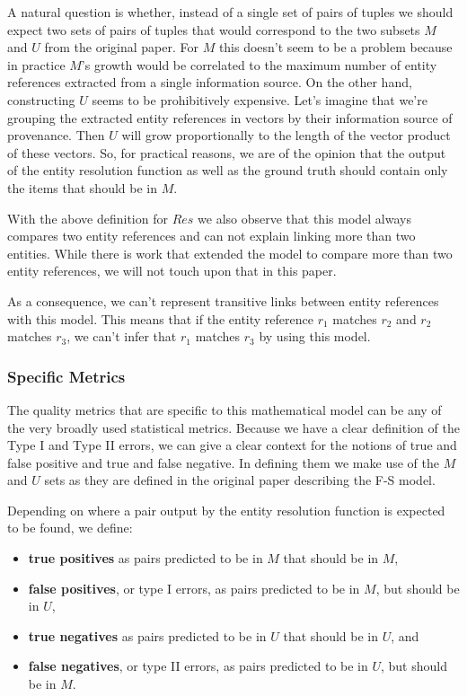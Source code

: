 \documentclass[11pt]{article}
\begin{document}
    A natural question is whether, instead of a single set of pairs of tuples we
    should expect two sets of pairs of tuples that would correspond to the two
    subsets $M$ and $U$ from the original paper.
    For $M$ this doesn't seem to be a problem because in practice $M$'s growth
    would be correlated to the maximum number of entity references extracted
    from a single information source.
    On the other hand, constructing $U$ seems to be prohibitively expensive.
    Let's imagine that we're grouping the extracted entity references in vectors
    by their information source of provenance.
    Then $U$ will grow proportionally to the length of the vector product of
    these vectors.
    So, for practical reasons, we are of the opinion that the output of the
    entity resolution function as well as the ground truth should contain only
    the items that should be in $M$.

    With the above definition for $Res$ we also observe that this model always
    compares two entity references and can not explain linking more than two
    entities\cite{Tal11}.
    While there is work that extended the model to compare more than two 
    entity references\cite{Kon19}, we will not touch upon that in this paper.
    
    As a consequence, we can't represent transitive links between entity
    references with this model.
    This means that if the entity reference $r_1$ matches $r_2$ and
    $r_2$ matches $r_3$, we can't infer that $r_1$ matches $r_3$ by using this
    model\cite{Tal11}.

    \subsubsection[fms-measure]{Specific Metrics}\label{fsm-measure}

    The quality metrics that are specific to this mathematical model can be any
    of the very broadly used statistical metrics.
    Because we have a clear definition of the Type I and Type II errors, we can
    give a clear context for the notions of true and false positive and true and
    false negative.
    In defining them we make use of the $M$ and $U$ sets as they are defined in
    the original paper describing the F-S model.

    Depending on where a pair output by the entity resolution function is
    expected to be found, we define:

    \begin{itemize}
        \item \textbf{true positives} as pairs predicted to be in $M$ that
        should be in $M$,
        \item \textbf{false positives}, or type I errors, as pairs predicted to
        be in $M$, but should be in $U$,
        \item \textbf{true negatives} as pairs predicted to be in $U$ that
        should be in $U$, and
        \item \textbf{false negatives}, or type II errors, as pairs predicted to
        be in $U$, but should be in $M$.
    \end{itemize}
\end{document}
